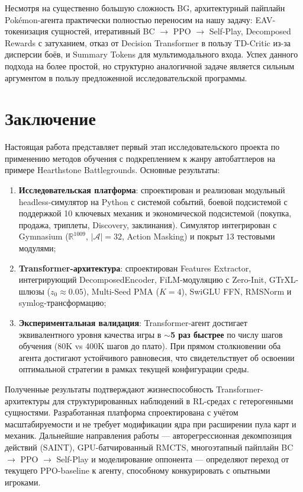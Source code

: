 \documentclass[a4paper,12pt]{extarticle}
\begin{document}
Несмотря на существенно большую сложность BG, архитектурный пайплайн Pok\'{e}mon-агента практически полностью переносим на нашу задачу: EAV-токенизация сущностей, итеративный BC $\to$ PPO $\to$ Self-Play, Decomposed Rewards с затуханием, отказ от Decision Transformer в пользу TD-Critic из-за дисперсии боёв, и Summary Tokens для мультимодального входа. Успех данного подхода на более простой, но структурно аналогичной задаче является сильным аргументом в пользу предложенной исследовательской программы.

\newpage

\section{Заключение}

Настоящая работа представляет первый этап исследовательского проекта по применению методов обучения с подкреплением к жанру автобаттлеров на примере Hearthstone Battlegrounds. Основные результаты:

\begin{enumerate}[noitemsep]
  \item \textbf{Исследовательская платформа}: спроектирован и реализован модульный headless-симулятор на Python с системой событий, боевой подсистемой с поддержкой 10 ключевых механик и экономической подсистемой (покупка, продажа, триплеты, Discovery, заклинания). Симулятор интегрирован с Gymnasium ($\mathbb{R}^{1009}$, $|\mathcal{A}| = 32$, Action Masking) и покрыт 13 тестовыми модулями;

  \item \textbf{Transformer-архитектура}: спроектирован Features Extractor, интегрирующий DecomposedEncoder, FiLM-модуляцию с Zero-Init, GTrXL-шлюзы ($z_0 \approx 0.05$), Multi-Seed PMA ($K=4$), SwiGLU FFN, RMSNorm и symlog-трансформацию;

  \item \textbf{Экспериментальная валидация}: Transformer-агент достигает эквивалентного уровня качества игры в \textbf{$\sim$5 раз быстрее} по числу шагов обучения (80K vs 400K шагов до плато). При прямом столкновении оба агента достигают устойчивого равновесия, что свидетельствует об освоении оптимальной стратегии в рамках текущей конфигурации среды.
\end{enumerate}

Полученные результаты подтверждают жизнеспособность Transformer-архитектуры для структурированных наблюдений в RL-средах с гетерогенными сущностями. Разработанная платформа спроектирована с учётом масштабируемости и не требует модификации ядра при расширении пула карт и механик. Дальнейшие направления работы --- авторегрессионная декомпозиция действий (SAINT), GPU-батчированный RMCTS, многоэтапный пайплайн BC $\to$ PPO $\to$ Self-Play и моделирование оппонента --- определяют переход от текущего PPO-baseline к агенту, способному конкурировать с опытными игроками.
\end{document}
